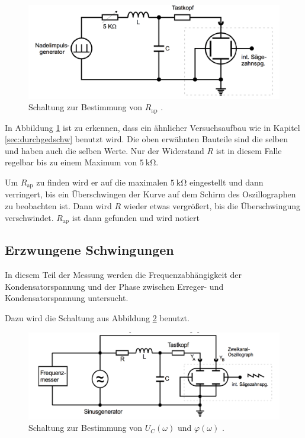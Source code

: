 \begin{figure}[h]
  \centering
  \includegraphics[width = \textwidth]{Schaltungb.pdf}
  \caption{Schaltung zur Bestimmung von $R_{\text{ap}}$ \cite{anleitung}.}
  \label{fig:schaltb}
\end{figure}

In Abbildung \ref{fig:schaltb} ist zu erkennen, dass ein ähnlicher
Versuchsaufbau wie in Kapitel \ref{sec:durchgedschw} benutzt wird.
Die oben erwähnten Bauteile sind die selben und haben auch die selben Werte.
Nur der Widerstand $R$ ist in diesem Falle regelbar bis zu einem Maximum
von $\SI{5}{\kilo\ohm}$.

Um $R_{\text{ap}}$ zu finden wird er auf die maximalen $\SI{5}{\kilo\ohm}$
eingestellt und dann verringert, bis ein Überschwingen der Kurve auf dem
Schirm des Oszillographen zu beobachten ist. Dann wird $R$ wieder etwas
vergrößert, bis die Überschwingung verschwindet. $R_{\text{ap}}$ ist dann
gefunden und wird notiert

\subsection{Erzwungene Schwingungen}

In diesem Teil der Messung werden die Frequenzabhängigkeit der Kondensatorspannung
und der Phase zwischen Erreger- und Kondensatorspannung untersucht.

Dazu wird die Schaltung aus Abbildung \ref{fig:schaltcd} benutzt.

\begin{figure}[h]
  \centering
  \includegraphics[width = \textwidth]{Schaltungcd.pdf}
  \caption{Schaltung zur Bestimmung von $U_C(\omega)$ und $\varphi(\omega)$ \cite{anleitung}.}
  \label{fig:schaltcd}
\end{figure}

